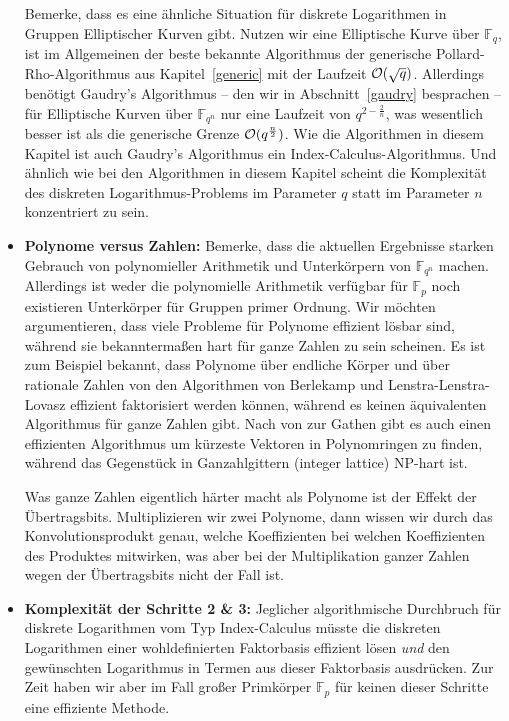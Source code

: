 \begin{refsegment}
\begin{itemize}
Bemerke, dass es eine ähnliche Situation für diskrete Logarithmen in Gruppen Elliptischer Kurven gibt. Nutzen wir eine Elliptische Kurve über $\mathbb{F}_q$, ist im Allgemeinen der beste bekannte Algorithmus der generische Pollard-Rho-Algorithmus aus Kapitel~\ref{generic} mit der Laufzeit ${\cal O}(\sqrt q)$. Allerdings benötigt Gaudry's Algorithmus -- den wir in Abschnitt~\ref{gaudry} besprachen -- für Elliptische Kurven über $\mathbb{F}_{q^n}$ nur eine Laufzeit von $q^{2-\frac 2 n}$, was wesentlich besser ist als die generische Grenze ${\cal O}(q^{\frac n 2})$. Wie die Algorithmen in diesem Kapitel ist auch Gaudry's Algorithmus ein Index-Calculus-Algorithmus. Und ähnlich wie bei den Algorithmen in diesem Kapitel scheint die Komplexität des diskreten Logarithmus-Problems im Parameter $q$ statt im Parameter $n$ konzentriert zu sein.

\item\textbf{Polynome versus Zahlen:} Bemerke, dass die aktuellen Ergebnisse starken Gebrauch von polynomieller Arithmetik und Unterkörpern von $\mathbb{F}_{q^n}$ machen. Allerdings ist weder die polynomielle Arithmetik verfügbar für $\mathbb{F}_p$ noch existieren Unterkörper für Gruppen primer Ordnung. Wir möchten argumentieren, dass viele Probleme für Polynome effizient lösbar sind, während sie bekanntermaßen hart für ganze Zahlen zu sein scheinen. Es ist zum Beispiel bekannt, dass Polynome über endliche Körper und über rationale Zahlen von den Algorithmen von Berlekamp und Lenstra-Lenstra-Lovasz effizient faktorisiert werden können, während es keinen äquivalenten Algorithmus für ganze Zahlen gibt. Nach von zur Gathen gibt es auch einen effizienten Algorithmus um kürzeste Vektoren in Polynomringen zu finden, während das Gegenstück in Ganzahlgittern (integer lattice) NP-hart ist.

Was ganze Zahlen eigentlich härter macht als Polynome ist der Effekt der Übertragsbits. Multiplizieren wir zwei Polynome, dann wissen wir durch das Konvolutionsprodukt genau, welche Koeffizienten bei welchen Koeffizienten des Produktes mitwirken, was aber bei der Multiplikation ganzer Zahlen wegen der Übertragsbits nicht der Fall ist.

\item\textbf{Komplexität der Schritte 2 \& 3:} Jeglicher algorithmische Durchbruch für diskrete Logarithmen vom Typ Index-Calculus müsste die diskreten Logarithmen einer wohldefinierten Faktorbasis effizient lösen {\em und} den gewünschten Logarithmus in Termen aus dieser Faktorbasis ausdrücken. Zur Zeit haben wir aber im Fall großer Primkörper $\mathbb{F}_p$ für keinen dieser Schritte eine effiziente Methode.
\end{itemize}


\end{refsegment}
